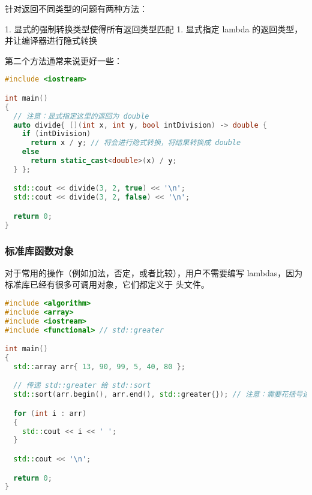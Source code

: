 \documentclass[../../LearnCpp.tex]{subfiles}
\begin{document}
针对返回不同类型的问题有两种方法：

1. 显式的强制转换类型使得所有返回类型匹配
1. 显式指定 lambda 的返回类型，并让编译器进行隐式转换

第二个方法通常来说更好一些：

\begin{lstlisting}[language=C++]
#include <iostream>

int main()
{
  // 注意：显式指定这里的返回为 double
  auto divide{ [](int x, int y, bool intDivision) -> double {
    if (intDivision)
      return x / y; // 将会进行隐式转换，将结果转换成 double
    else
      return static_cast<double>(x) / y;
  } };

  std::cout << divide(3, 2, true) << '\n';
  std::cout << divide(3, 2, false) << '\n';

  return 0;
}
\end{lstlisting}

\subsubsection*{标准库函数对象}

对于常用的操作（例如加法，否定，或者比较），用户不需要编写 lambdas，因为标准库已经有很多可调用对象，它们都定义于  头文件。

\begin{lstlisting}[language=C++]
#include <algorithm>
#include <array>
#include <iostream>
#include <functional> // std::greater

int main()
{
  std::array arr{ 13, 90, 99, 5, 40, 80 };

  // 传递 std::greater 给 std::sort
  std::sort(arr.begin(), arr.end(), std::greater{}); // 注意：需要花括号进行实例化

  for (int i : arr)
  {
    std::cout << i << ' ';
  }

  std::cout << '\n';

  return 0;
}
\end{lstlisting}
\end{document}
